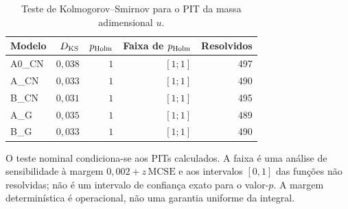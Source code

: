 \begin{table}[htbp]
\centering
\caption{Teste de Kolmogorov--Smirnov para o PIT da massa adimensional $u$.}
\label{tab:c07-pit-massa}
\begingroup\small\setlength{\tabcolsep}{4pt}
\begin{tabular}{@{}lrrrr@{}}
\toprule
Modelo & $D_{\rm KS}$ & $p_{\rm Holm}$ & Faixa de $p_{\rm Holm}$ & Resolvidos \\
\midrule
A0\_CN & $0{,}038$ & $1$ & $[1;1]$ & 497 \\
A\_CN & $0{,}033$ & $1$ & $[1;1]$ & 490 \\
B\_CN & $0{,}031$ & $1$ & $[1;1]$ & 495 \\
A\_G & $0{,}035$ & $1$ & $[1;1]$ & 489 \\
B\_G & $0{,}033$ & $1$ & $[1;1]$ & 490 \\
\bottomrule
\end{tabular}
\endgroup
\par\smallskip\begin{minipage}{0.96\textwidth}\footnotesize O teste nominal condiciona-se aos PITs calculados. A faixa é uma análise de sensibilidade à margem $0{,}002+z\,\mathrm{MCSE}$ e aos intervalos $[0,1]$ das funções não resolvidas; não é um intervalo de confiança exato para o valor-$p$. A margem determinística é operacional, não uma garantia uniforme da integral.\end{minipage}
\end{table}
